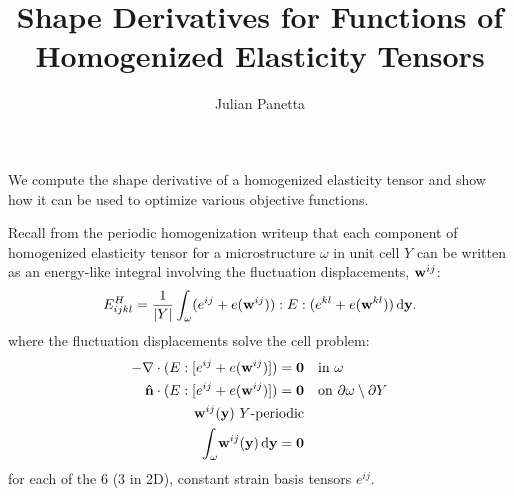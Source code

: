 \documentclass[10pt]{article}
\title{Shape Derivatives for Functions of Homogenized Elasticity Tensors}
\author{Julian Panetta}
\begin{document}
\maketitle

We compute the shape derivative of a homogenized elasticity tensor and show how
it can be used to optimize various objective functions.

Recall from the periodic homogenization writeup that each component of
homogenized elasticity tensor for a microstructure $\omega$ in unit cell $Y$
can be written as an energy-like integral involving the fluctuation
displacements, ${\bf w}^{ij}$:
\begin{equation}
    \label{eqn:EhEnergy}
    E^H_{ijkl} = \frac{1}{|Y|} \int_\omega (e^{ij} + e({\bf w}^{ij})) : E : (e^{kl} + e({\bf w}^{kl})) \, \mathrm{d} {\bf y}.
\end{equation}
where the fluctuation displacements solve the cell problem:
\begin{equation}
\label{eqn:cell_constraint}
\begin{aligned}
     -\nabla \cdot (E : [e^{ij} + e({\bf w}^{ij})]) = {\bf 0} & \quad \text{in } \omega \\
{\bf \hat n} \cdot (E : [e^{ij} + e({\bf w}^{ij})]) = {\bf 0} & \quad \text{on } \partial \omega \setminus \partial Y \\
    {\bf w}^{ij}({\bf y})\ Y \text{-periodic} & \\
    \int_\omega \! {\bf w}^{ij}({\bf y})  \, \mathrm{d} {\bf y} =  {\bf 0}
\end{aligned}
\end{equation}
for each of the 6 (3 in 2D), constant strain basis tensors $e^{ij}$.

\end{document}

